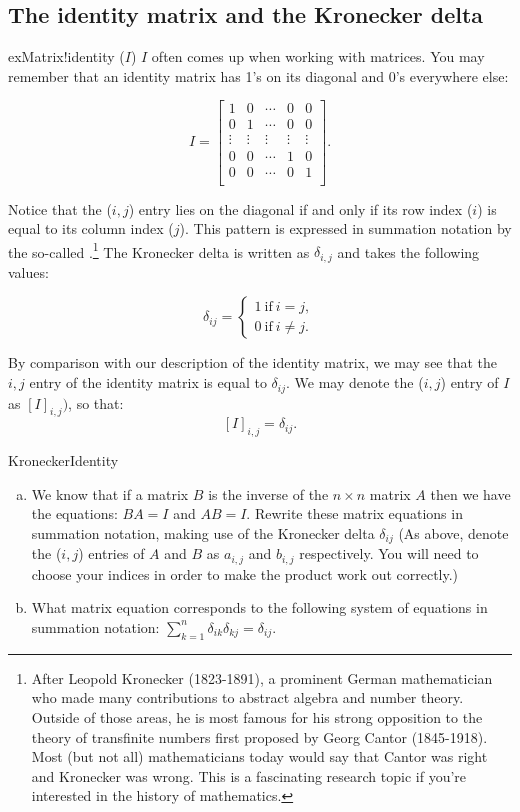 \subsection{The identity matrix and the Kronecker delta}

ex{Matrix!identity ($I$)} $I$ often comes up when working with matrices. You may remember that an identity matrix has 1's on its diagonal and 0's everywhere else:

\[I = \left[ \begin{array}{ccccc}
1 & 0  & \cdots & 0 & 0 \\
0 & 1  & \cdots & 0 & 0  \\
\vdots & \vdots & \vdots & \vdots & \vdots\\
0 & 0  & \cdots & 1 & 0  \\
0 & 0  & \cdots & 0 & 1  \\
 \end{array} \right]. \]

Notice that the ($i,j$) entry lies on the diagonal if and only if its row index ($i$) is equal to its column index ($j$).  This pattern is expressed in summation notation  by the so-called  
 .\footnote{After Leopold Kronecker (1823-1891), a prominent German mathematician who made many contributions to abstract algebra and number theory. Outside of those areas, he is most famous for his strong opposition to the theory of transfinite numbers first proposed by Georg Cantor (1845-1918).  Most (but not all) mathematicians today would say that Cantor was right and Kronecker was wrong. This is a fascinating research topic if you're interested in the history of mathematics.} The Kronecker delta is written as $\delta_{i,j}$ and takes the following values:

\[ \delta_{ij}=
\begin{cases}
1 ~ \text{if} ~ i=j,  \\
0 ~ \text{if} ~ i \neq j.
\end{cases} \]

By comparison with our description of the identity matrix, we may see that the $i,j$ entry of the identity matrix is equal to $\delta_{ij}$. We may denote the ($i,j$) entry of $I$ as $[I]_{i,j})$, so that:
\[  [I]_{i,j} = \delta_{ij}.\]

\begin{exercise}{KroneckerIdentity}
\begin{enumerate}[(a)]
\item
We know that if a matrix $B$ is the inverse of the $n \times n$ matrix $A$ then we have the equations: $BA = I$ and $AB = I$.  Rewrite these matrix equations in summation notation, making use of the Kronecker delta $\delta_{ij}$ (As above, denote the ($i,j$) entries of $A$ and $B$ as $a_{i,j}$ and $b_{i,j}$ respectively. You will need to choose your indices in order to make the product work out correctly.) 
\item
What matrix equation corresponds to the following system of equations in summation notation: $\displaystyle{ \sum_{k=1}^n  \delta_{ik}\delta_{kj}=\delta_{ij}}.$
\end{enumerate}
\end{exercise}

